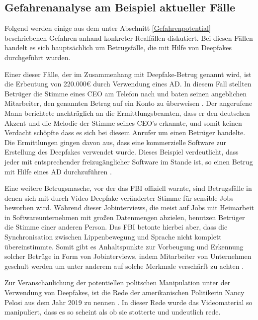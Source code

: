 \subsection{Gefahrenanalyse am Beispiel aktueller Fälle}\label{GefahrenAktuelleFaelle}
Folgend werden einige aus dem unter Abschnitt \ref{Gefahrenpotential} beschriebenen Gefahren anhand konkreter Realfällen diskutiert. 
Bei diesen Fällen handelt es sich hauptsächlich um Betrugsfälle, die mit Hilfe von Deepfakes durchgeführt wurden.
\par
Einer dieser Fälle, der im Zusammenhang mit Deepfake-Betrug genannt wird, ist die Erbeutung von 220.000\euro{} durch Verwendung eines AD.
In diesem Fall stellten Betrüger die Stimme eines CEO am Telefon nach und baten seinen angeblichen Mitarbeiter, den genannten Betrag auf ein Konto zu überweisen \citep[][]{Stupp2019}. 
Der angerufene Mann berichtete nachträglich an die Ermittlungsbeamten, dass er den deutschen Akzent und die Melodie der Stimme seines CEO's erkannte, und somit keinen Verdacht schöpfte dass es sich bei diesem Anrufer um einen Betrüger handelte.
Die Ermittlungen gingen davon aus, dass eine kommerzielle Software zur Erstellung des Deepfakes verwendet wurde.
Dieses Beispiel verdeutlicht, dass jeder mit entsprechender freizugänglicher Software im Stande ist, so einen Betrug mit Hilfe eines AD durchzuführen \citep[Vgl.][]{Stupp2019}. 
\par
Eine weitere Betrugsmasche, vor der das FBI offiziell warnte, sind Betrugsfälle in denen sich mit durch Video Deepfake veränderter Stimme für sensible Jobs beworben wird.
Während dieser Jobinterviews, die meist auf Jobs mit Heimarbeit in Softwareunternehmen mit großen Datenmengen abzielen, benutzen Betrüger die Stimme einer anderen Person.
Das FBI betonte hierbei aber, dass die Synchronisation zwischen Lippenbewegung und Sprache nicht komplett übereinstimmte.
Somit gibt es Anhaltspunkte zur Vorbeugung und Erkennung solcher Betrüge in Form von Jobinterviews, indem Mitarbeiter von Unternehmen geschult werden um unter anderem auf solche Merkmale verschärft zu achten \citep[][]{Ferraro2022}. 
\par
Zur Veranschaulichung der potentiellen politschen Manipulation unter der Verwendung von Deepfakes, ist die Rede der amerikanischen Politikerin Nancy Pelosi aus dem Jahr 2019 zu nennen \citep[Vgl.][]{Mervosh2019}.
In dieser Rede wurde das Videomaterial so manipuliert, dass es so scheint als ob sie stotterte und undeutlich rede.
